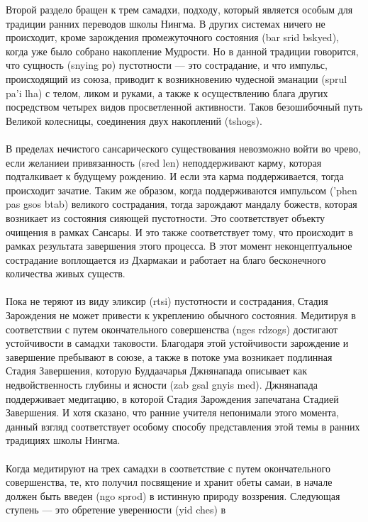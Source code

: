\begin{siderules}
Второй раздело бращен к трем самадхи, подходу, который является особым для традиции
ранних переводов школы Нингма. В других системах ничего не происходит, кроме
зарождения промежуточного состояния (bar srid bskyed), когда уже было собрано накопление
Мудрости. Но в данной традиции говорится, что сущность (snying ро) пустотности — это
сострадание, и что импульс, происходящий из союза, приводит к возникновению чудесной
эманации (sprul pa'i lha) с телом, ликом и руками, а также к осуществлению блага других
посредством четырех видов просветленной активности. Таков безошибочный путь Великой
колесницы, соединения двух накоплений (tshogs).\\
\\
В пределах нечистого сансарического существования невозможно войти во чрево, если
желаниеи привязанность (sred len) неподдерживают карму, которая подталкивает к
будущему рождению. И если эта карма поддерживается, тогда происходит зачатие. Таким же
образом, когда поддерживаются импульсом ('phen pas gsos btab) великого сострадания, тогда
зарождают мандалу божеств, которая возникает из состояния сияющей пустотности. Это
соответствует объекту очищения в рамках Сансары. И это также соответствует тому, что
происходит в рамках результата завершения этого процесса. В этот момент
неконцептуальное сострадание воплощается из Дхармакаи и работает на благо бесконечного
количества живых существ.\\
\\
Пока не теряют из виду эликсир (rtsi) пустотности и сострадания, Стадия Зарождения не
может привести к укреплению обычного состояния. Медитируя в соответствии с путем
окончательного совершенства (nges rdzogs) достигают устойчивости в самадхи таковости.
Благодаря этой устойчивости зарождение и завершение пребывают в союзе, а также в потоке
ума возникает подлинная Стадия Завершения, которую Буддаачарья Джнянапада описывает
как недвойственность глубины и ясности (zab gsal gnyis med). Джнянапада поддерживает
медитацию, в которой Стадия Зарождения запечатана Стадией Завершения. И хотя сказано,
что ранние учителя непонимали этого момента, данный взгляд соответствует особому
способу представления этой темы в ранних традициях школы Нингма.\\
\\
Когда медитируют на трех самадхи в соответствие с путем окончательного совершенства, те,
кто получил посвящение и хранит обеты самаи, в начале должен быть введен (ngo sprod) в
истинную природу воззрения. Следующая ступень — это обретение уверенности (yid ches) в

\end{siderules}

